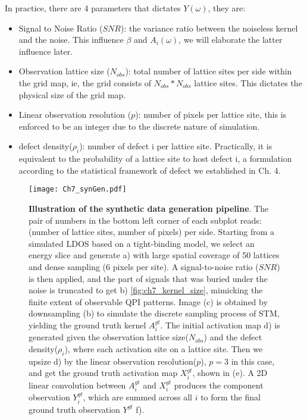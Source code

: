 In practice, there are 4 parameters that dictates $Y(\omega)$, they are:
\begin{itemize}
	\item Signal to Noise Ratio ($SNR$): the variance ratio between the noiseless kernel and the noise. This influence $\beta$ and $A_i(\omega)$, we will elaborate the latter influence later. 
	\item Observation lattice size ($N_{obs}$): total number of lattice sites per side within the grid map, ie, the grid consists of $N_{obs}*N_{obs}$ lattice sites. This dictates the physical size of the grid map. 
	\item Linear observation resolution ($p$): number of pixels per lattice site, this is enforced to be an integer due to the discrete nature of simulation. 
	\item defect density($\rho_i$): number of defect i per lattice site. Practically, it is equivalent to the probability of a lattice site to host defect i, a formulation according to the statistical framework of defect we established in Ch. 4.
\end{itemize}
\begin{figure}
	\texttt{[image: Ch7\_synGen.pdf]} 
	\centering
	\caption[\textbf{Illustration of the synthetic data generation pipeline}]{\textbf{Illustration of the synthetic data generation pipeline}. The pair of numbers in the bottom left corner of each subplot reads: (number of lattice sites, number of pixels) per side. Starting from a simulated \ac{LDOS} based on a tight-binding model, we select an energy slice and generate a) with large spatial coverage of 50 lattices and dense sampling (6 pixels per site). A signal-to-noise ratio ($SNR$) is then applied, and the part of signals that was buried under the noise is truncated to get b) \ref{fig:ch7_kernel_size}, mimicking the finite extent of observable \ac{QPI} patterns. Image (c) is obtained by downsampling (b) to simulate the discrete sampling process of \ac{STM}, yielding the ground truth kernel $A^{gt}_i$. The initial activation map d) is generated given the observation lattice size($N_{obs}$) and the defect density($\rho_i$), where each activation site on a lattice site. Then we upsize d) by the linear observation resolution($p$), $p=3$ in this case, and get the ground truth activation map $X^{gt}_i$, shown in (e). A 2D linear convolution between $A^{gt}_i$ and $X^{gt}_i$ produces the component observation $Y^{gt}_i$, which are summed across all $i$ to form the final ground truth observation $Y^{gt}$ f).}
	\label{fig:ch7syn}
\end{figure}

